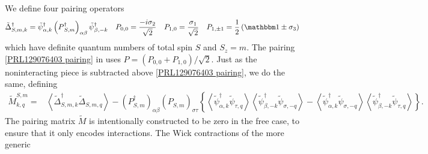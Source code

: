 We define four pairing operators
\begin{align}
    \tilde{\Delta}\adjoint_{S,m,k} &= \tilde{\psi}\adjoint_{\alpha,k} \left(P\adjoint_{S,m}\right)_{\alpha\beta} \tilde{\psi}\adjoint_{\beta,-k}
    &
    P_{0,0} &= \frac{-i \sigma_2}{\sqrt{2}}
    &
    P_{1,0} &= \frac{\sigma_1}{\sqrt{2}}
    &
    P_{1,\pm1} &= \oneover{2}\left( \one \pm \sigma_3 \right)
\end{align}
which have definite quantum numbers of total spin $S$ and $S_z=m$.
The pairing \eqref{PRL129076403 pairing} in  uses $P = (P_{0,0} + P_{1,0})/\sqrt{2}$.
Just as the noninteracting piece is subtracted above \eqref{PRL129076403 pairing}, we do the same, defining
\begin{align}
    \tilde{M}^{S,m}_{k,q} =&
      \left\langle \tilde{\Delta}^\dagger_{S,m,k} \tilde{\Delta}_{S,m,q} \right\rangle
    - \left(P^\dagger_{S,m}\right)_{\alpha\beta} \left(P^{\phantom{\dagger}}_{S,m}\right)_{\sigma\tau} \left\{
            \left\langle \tilde{\psi}^\dagger_{\alpha, k} \tilde{\psi}_{\tau, q} \right\rangle \left\langle \tilde{\psi}^\dagger_{\beta, -k} \tilde{\psi}_{\sigma, -q} \right\rangle
        -   \left\langle \tilde{\psi}^\dagger_{\alpha, k} \tilde{\psi}_{\sigma, -q} \right\rangle \left\langle \tilde{\psi}^\dagger_{\beta, -k} \tilde{\psi}_{\tau, q} \right\rangle
    \right\}.
    \label{eq:pairing matrix}
\end{align}
The pairing matrix $\tilde{M}$ is intentionally constructed to be zero in the free case, to ensure that it only encodes interactions.
The Wick contractions of the more generic

